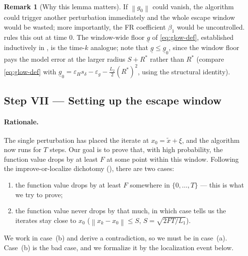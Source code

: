 \documentclass[11pt,a4paper]{article}
\theoremstyle{plain}
\theoremstyle{definition}
\newtheorem{remark}{Remark}
\newcommand{\norm}[1]{\left\|#1\right\|}
\newcommand{\eps}{\varepsilon}
\newcommand{\epsg}{\eps_{g}}
\newcommand{\epsH}{\eps_{H}}
\newcommand{\Lone}{L_{1}}
\newcommand{\Ltwo}{L_{2}}
\newcommand{\snap}{\tilde{x}}
\newcommand{\sdel}{s_{\delta}}
\newcommand{\glow}{\underline{g}}
\newcommand{\Rstar}{R^{*}}
\begin{document}
\begin{remark}[Why this lemma matters]
If $\norm{g_{0}}$ could vanish, the algorithm could trigger another perturbation
immediately and the whole escape window would be wasted; more importantly, the FR
coefficient $\beta_{1}$ would be uncontrolled.  rules this out at
time $0$. The window-wide floor $\glow$ of \eqref{eq:glow-def}, established
inductively in , is the time-$k$ analogue; note that
$\glow \le \glow_{0}$, since the window floor pays the model error at the larger
radius $S+\Rstar$ rather than $\Rstar$ (compare \eqref{eq:glow-def} with
$\glow_{0} = \epsH\sdel - \epsg - \tfrac{\Ltwo}{2}(\Rstar)^{2}$, using the
structural identity).
\end{remark}

\subsection{Step VII --- Setting up the escape window}\label{ssec:setting}

\paragraph{Rationale.}
The single perturbation has placed the iterate at $x_0 = \snap + \xi$, and
the algorithm now runs for $T$ steps. Our goal is to prove that, with
high probability, the function value drops by at least $F$ at some point
within this window. Following the improve-or-localize dichotomy
(), there are two cases:
\begin{enumerate}[label=(\alph*)]
\item the function value drops by at least $F$ somewhere in $\{0,\dots,T\}$ ---
this is what we try to prove;
\item the function value never drops by that much, in which case
 tells us the iterates stay close to $x_{0}$
($\norm{x_{k}-x_{0}}\le S$, $S=\sqrt{2FT/\Lone}$).
\end{enumerate}
We work in case~(b) and derive a contradiction, so we must be in case~(a). Case~(b)
is the bad case, and we formalize it by the localization event below.
\end{document}
